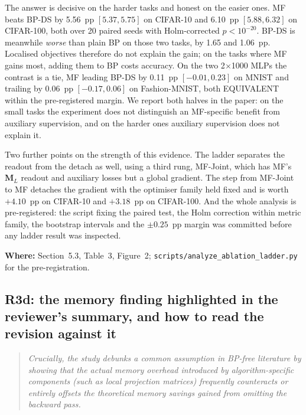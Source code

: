 \documentclass[11pt,a4paper]{article}
\newcommand{\MF}{MF}
\newcommand{\BP}{BP}
\newcommand{\BPDS}{BP-DS}
\newcommand{\MFJ}{MF-Joint}
\newenvironment{comment}%
  {\begin{quote}\itshape\small}%
  {\end{quote}}
\newcommand{\where}[1]{\par\smallskip\noindent\textbf{Where:} #1\par}
\begin{document}
The answer is decisive on the harder tasks and honest on the easier ones.
\MF{} beats \BPDS{} by \num{5.56}~pp $[\num{+5.37},\num{+5.75}]$ on CIFAR-10
and \num{6.10}~pp $[\num{+5.88},\num{+6.32}]$ on CIFAR-100, both over
\num{20} paired seeds with Holm-corrected $p<10^{-20}$. \BPDS{} is meanwhile
\emph{worse} than plain \BP{} on those two tasks, by \num{1.65} and
\num{1.06}~pp. Localised objectives therefore do not explain the gain; on the
tasks where \MF{} gains most, adding them to \BP{} costs accuracy. On the two
\num{2}$\times$\num{1000} MLPs the contrast is a tie, \MF{} leading \BPDS{} by
\num{0.11}~pp $[\num{-0.01},\num{+0.23}]$ on MNIST and trailing by
\num{0.06}~pp $[\num{-0.17},\num{+0.06}]$ on Fashion-MNIST, both EQUIVALENT
within the pre-registered margin. We report both halves in the paper: on the
small tasks the experiment does not distinguish an \MF{}-specific benefit from
auxiliary supervision, and on the harder ones auxiliary supervision does not
explain it.

Two further points on the strength of this evidence. The ladder separates the
readout from the detach as well, using a third rung, \MFJ{}, which has
\MF{}'s $\mathbf{M}_L$ readout and auxiliary losses but a global gradient. The step
from \MFJ{} to \MF{} detaches the gradient with the optimiser family held
fixed and is worth $+\num{4.10}$~pp on CIFAR-10 and $+\num{3.18}$~pp on
CIFAR-100. And the whole
analysis is pre-registered: the script fixing the paired test, the Holm
correction within metric family, the bootstrap intervals and the
$\pm\num{0.25}$~pp margin was committed before any ladder result was
inspected.

\where{Section~5.3, Table~3, Figure~2;
\texttt{scripts/analyze\_ablation\_ladder.py} for the pre-registration.}

\subsection*{R3d: the memory finding highlighted in the reviewer's summary,
and how to read the revision against it}

\begin{comment}
Crucially, the study debunks a common assumption in BP-free literature by
showing that the actual memory overhead introduced by algorithm-specific
components (such as local projection matrices) frequently counteracts or
entirely offsets the theoretical memory savings gained from omitting the
backward pass.
\end{comment}
\end{document}
